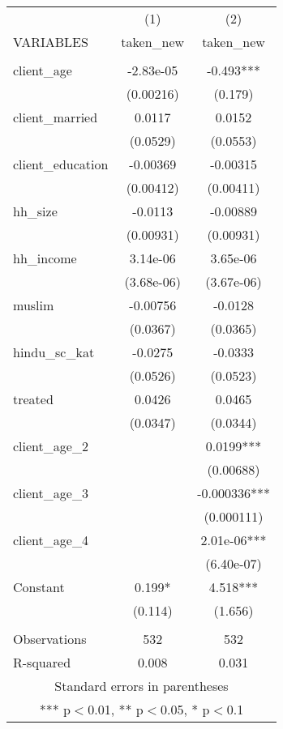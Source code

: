 \begin{tabular}{lcc} \hline
 & (1) & (2) \\
VARIABLES & taken\_new & taken\_new \\ \hline
 &  &  \\
client\_age & -2.83e-05 & -0.493*** \\
 & (0.00216) & (0.179) \\
client\_married & 0.0117 & 0.0152 \\
 & (0.0529) & (0.0553) \\
client\_education & -0.00369 & -0.00315 \\
 & (0.00412) & (0.00411) \\
hh\_size & -0.0113 & -0.00889 \\
 & (0.00931) & (0.00931) \\
hh\_income & 3.14e-06 & 3.65e-06 \\
 & (3.68e-06) & (3.67e-06) \\
muslim & -0.00756 & -0.0128 \\
 & (0.0367) & (0.0365) \\
hindu\_sc\_kat & -0.0275 & -0.0333 \\
 & (0.0526) & (0.0523) \\
treated & 0.0426 & 0.0465 \\
 & (0.0347) & (0.0344) \\
client\_age\_2 &  & 0.0199*** \\
 &  & (0.00688) \\
client\_age\_3 &  & -0.000336*** \\
 &  & (0.000111) \\
client\_age\_4 &  & 2.01e-06*** \\
 &  & (6.40e-07) \\
Constant & 0.199* & 4.518*** \\
 & (0.114) & (1.656) \\
 &  &  \\
Observations & 532 & 532 \\
 R-squared & 0.008 & 0.031 \\ \hline
\multicolumn{3}{c}{ Standard errors in parentheses} \\
\multicolumn{3}{c}{ *** p$<$0.01, ** p$<$0.05, * p$<$0.1} \\
\end{tabular}
